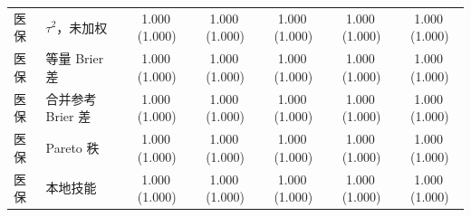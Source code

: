 \documentclass[11pt,a4paper,fontset=none]{ctexart}
\newcommand{\meanmin}[2]{#1\,{\scriptsize(#2)}}
\begin{document}
\begin{landscape}
\begin{table}[p]
\begin{tabular}{@{}llccccc@{}}
医保 & \(\tau^{2}\)，未加权 & \meanmin{1.000}{1.000} & \meanmin{1.000}{1.000} & \meanmin{1.000}{1.000} & \meanmin{1.000}{1.000} & \meanmin{1.000}{1.000} \\
医保 & 等量 Brier 差 & \meanmin{1.000}{1.000} & \meanmin{1.000}{1.000} & \meanmin{1.000}{1.000} & \meanmin{1.000}{1.000} & \meanmin{1.000}{1.000} \\
医保 & 合并参考 Brier 差 & \meanmin{1.000}{1.000} & \meanmin{1.000}{1.000} & \meanmin{1.000}{1.000} & \meanmin{1.000}{1.000} & \meanmin{1.000}{1.000} \\
医保 & Pareto 秩 & \meanmin{1.000}{1.000} & \meanmin{1.000}{1.000} & \meanmin{1.000}{1.000} & \meanmin{1.000}{1.000} & \meanmin{1.000}{1.000} \\
医保 & 本地技能 & \meanmin{1.000}{1.000} & \meanmin{1.000}{1.000} & \meanmin{1.000}{1.000} & \meanmin{1.000}{1.000} & \meanmin{1.000}{1.000} \\
\bottomrule
\end{tabular}
\end{table}
\end{landscape}
\end{document}
